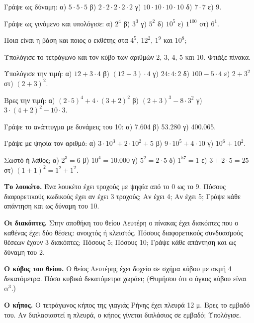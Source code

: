 

\ex Γράψε ως δύναμη: α) $5\cdot 5\cdot 5$ \quad β) $2\cdot 2\cdot 2\cdot 2\cdot 2$ \quad γ) $10\cdot 10\cdot 10\cdot 10$ \quad δ) $7\cdot 7$ \quad ε) $9$.

\ex Γράψε ως γινόμενο και υπολόγισε: α) $2^4$ \quad β) $3^3$ \quad γ) $5^2$ \quad δ) $10^5$ \quad ε) $1^{100}$ \quad στ) $6^1$.

\ex Ποια είναι η βάση και ποιος ο εκθέτης στα $4^5$, $12^2$, $1^{9}$ και $10^8$;

\ex Υπολόγισε το τετράγωνο και τον κύβο των αριθμών 2, 3, 4, 5 και 10. Φτιάξε πίνακα.

\ex Υπολόγισε την τιμή: α) $12+3\cdot 4$ \quad β) $(12+3)\cdot 4$ \quad γ) $24:4:2$ \quad δ) $100-5\cdot 4$ \quad ε) $2+3^2$ \quad στ) $(2+3)^2$.

\ex Βρες την τιμή: α) $(2\cdot 5)^4+4\cdot(3+2)^2$ \quad β) $(2+3)^3-8\cdot 3^2$ \quad γ) $3\cdot(4+2)^2-10\cdot 3$.

\ex Γράψε το ανάπτυγμα με δυνάμεις του 10: α) 7.604 \quad β) 53.280 \quad γ) 400.065.

\ex Γράψε με ψηφία τον αριθμό: α) $3\cdot 10^3+2\cdot 10^2+5$ \quad β) $9\cdot 10^5+4\cdot 10$ \quad γ) $10^6+10^2$.

\ex Σωστό ή λάθος; α) $2^3=6$ \quad β) $10^4=10.000$ \quad γ) $5^2=2\cdot 5$ \quad δ) $1^{57}=1$ \quad ε) $3+2\cdot 5=25$ \quad στ) $(1+1)^2=1^2+1^2$.


\ex \textbf{Το λουκέτο.} Ένα λουκέτο έχει τροχούς με ψηφία από το 0 ως το 9. Πόσους διαφορετικούς κωδικούς έχει αν έχει 3 τροχούς; Αν έχει 4; Αν έχει 5; Γράψε κάθε απάντηση και ως δύναμη του 10.

\ex \textbf{Οι διακόπτες.} Στην αποθήκη του θείου Λευτέρη ο πίνακας έχει διακόπτες που ο καθένας έχει δύο θέσεις: ανοιχτός ή κλειστός. Πόσους διαφορετικούς συνδυασμούς θέσεων έχουν 3 διακόπτες; Πόσους 5; Πόσους 10; Γράψε κάθε απάντηση και ως δύναμη του 2.

\ex \textbf{Ο κύβος του θείου.} Ο θείος Λευτέρης έχει δοχείο σε σχήμα κύβου με ακμή 4 δεκατόμετρα. Πόσα κυβικά δεκατόμετρα χωράει; (Θυμήσου ότι ο όγκος κύβου είναι $\alpha^3$.)

\ex \textbf{Ο κήπος.} Ο τετράγωνος κήπος της γιαγιάς Ρήνης έχει πλευρά 12 μ. Βρες το εμβαδό του. Αν διπλασιαστεί η πλευρά, ο κήπος γίνεται διπλάσιος σε εμβαδό; Υπολόγισε.

